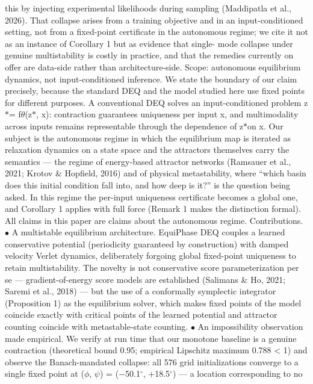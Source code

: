 \documentclass{article}
\begin{document}
this by injecting experimental likelihoods during sampling (Maddipatla et al., 2026). That collapse
arises from a training objective and in an input-conditioned setting, not from a fixed-point certificate
in the autonomous regime; we cite it not as an instance of Corollary 1 but as evidence that single-
mode collapse under genuine multistability is costly in practice, and that the remedies currently on
offer are data-side rather than architecture-side.
Scope: autonomous equilibrium dynamics, not input-conditioned inference.
We state the
boundary of our claim precisely, because the standard DEQ and the model studied here use
fixed points for different purposes.
A conventional DEQ solves an input-conditioned problem
z$*$= f$\theta$(z$*$, x): contraction guarantees uniqueness per input x, and multimodality across inputs
remains representable through the dependence of z$*$on x. Our subject is the autonomous regime
in which the equilibrium map is iterated as relaxation dynamics on a state space and the attractors
themselves carry the semantics --- the regime of energy-based attractor networks (Ramsauer et al.,
2021; Krotov \& Hopfield, 2016) and of physical metastability, where ``which basin does this initial
condition fall into, and how deep is it?'' is the question being asked. In this regime the per-input
uniqueness certificate becomes a global one, and Corollary 1 applies with full force (Remark 1
makes the distinction formal). All claims in this paper are claims about the autonomous regime.
Contributions.
$\bullet$  A multistable equilibrium architecture. EquiPhase DEQ couples a learned conservative
potential (periodicity guaranteed by construction) with damped velocity Verlet dynamics,
deliberately forgoing global fixed-point uniqueness to retain multistability. The novelty
is not conservative score parameterization per se --- gradient-of-energy score models are
established (Salimans \& Ho, 2021; Saremi et al., 2018) --- but the use of a conformally
symplectic integrator (Proposition 1) as the equilibrium solver, which makes fixed points
of the model coincide exactly with critical points of the learned potential and attractor
counting coincide with metastable-state counting.
$\bullet$  An impossibility observation made empirical. We verify at run time that our monotone
baseline is a genuine contraction (theoretical bound 0.95; empirical Lipschitz maximum
0.788 < 1) and observe the Banach-mandated collapse: all 576 grid initializations converge
to a single fixed point at ($\phi$, $\psi$) = ($-$50.1$^\circ$, +18.5$^\circ$) --- a location corresponding to no
\end{document}
